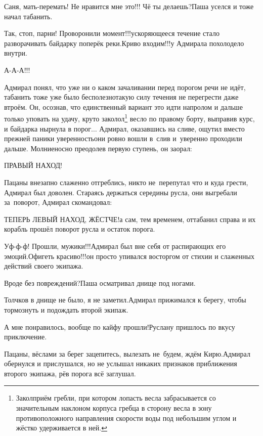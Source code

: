 \diagdash Саня, мать-перемать! Не нравится мне это!!! Чё ты делаешь?\mdash Паша уселся и тоже начал табанить.

\diagdash Так, стоп, парни! Проворонили момент!!!\mdash ускоряющееся течение стало разворачивать байдарку поперёк реки.\mdash Криво входим!!!\mdash у Адмирала похолодело внутри.

\diagdash А-А-А!!!

\renewcommand*{\thefootnote}{\fnsymbol{footnote}}
\setcounter{footnote}{0}
Адмирал понял, что уже ни о каком зачаливании перед порогом речи не идёт, табанить тоже уже было бесполезно\mdash такую силу течения не перегрести даже втроём. Он, осознав, что единственный вариант это идти напролом и дальше только уповать на удачу, круто заколол\footnote{Закол\mdash приём гребли, при котором лопасть весла забрасывается со значительным наклоном корпуса гребца в сторону весла в зону противоположного направления скорости воды под небольшим углом и жёстко удерживается в ней.} весло по правому борту, выправив курс, и байдарка нырнула в порог$\ldots$ Адмирал, оказавшись на сливе, ощутил вместо прежней паники уверенность\mdash они ровно вошли в~слив и~уверенно проходили дальше. Молниеносно преодолев первую ступень, он заорал:

\diagdash ПРАВЫЙ НАХОД!

Пацаны внезапно слаженно отгреблись, никто не~перепутал что и куда грести, Адмирал был доволен. Стараясь держаться середины русла, они выгребали за~поворот, Адмирал скомандовал:

\diagdash ТЕПЕРЬ ЛЕВЫЙ НАХОД, ЖЁСТЧЕ!\mdash а сам, тем временем, оттабанил справа и их корабль прошёл поворот русла и остаток порога.

\diagdash Уф-ф-ф! Прошли, мужики!!!\mdash Адмирал был вне себя от распирающих его эмоций.\mdash Офигеть красиво!!!\mdash он просто упивался восторгом от стихии и слаженных действий своего экипажа.

\diagdash Вроде без повреждений?\mdash Паша осматривал днище под ногами.

\diagdash Толчков в днище не было, я не заметил.\mdash Адмирал прижимался к берегу, чтобы тормознуть и подождать второй экипаж.

\diagdash А мне понравилось, вообще по кайфу прошли!\mdash Руслану пришлось по вкусу приключение.

\diagdash Пацаны, вёслами за берег зацепитесь, вылезать не~будем, ждём Кирю.\mdash Адмирал обернулся и прислушался, но не услышал никаких признаков приближения второго экипажа, рёв порога всё заглушал.

